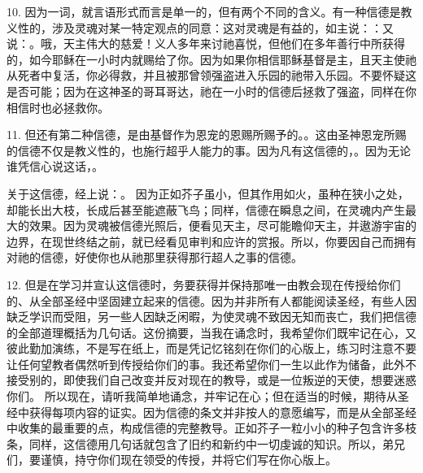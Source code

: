 10. 因为一词，就言语形式而言是单一的，但有两个不同的含义。有一种信德是教义性的，涉及灵魂对某一特定观点的同意：这对灵魂是有益的，如主说：：又说：。哦，天主伟大的慈爱！义人多年来讨祂喜悦，但他们在多年善行中所获得的，如今耶稣在一小时内就赐给了你。因为如果你相信耶稣基督是主，且天主使祂从死者中复活，你必得救，并且被那曾领强盗进入乐园的祂带入乐园。不要怀疑这是否可能；因为在这神圣的哥耳哥达，祂在一小时的信德后拯救了强盗，同样在你相信时也必拯救你。\par

11. 但还有第二种信德，是由基督作为恩宠的恩赐所赐予的。。这由圣神恩宠所赐的信德不仅是教义性的，也施行超乎人能力的事。因为凡有这信德的，。因为无论谁凭信心说这话，。\par

关于这信德，经上说：。 因为正如芥子虽小，但其作用如火，虽种在狭小之处，却能长出大枝，长成后甚至能遮蔽飞鸟；同样，信德在瞬息之间，在灵魂内产生最大的效果。因为灵魂被信德光照后，便看见天主，尽可能瞻仰天主，并遨游宇宙的边界，在现世终结之前，就已经看见审判和应许的赏报。所以，你要因自己而拥有对祂的信德，好使你也从祂那里获得那行超人之事的信德。\par

12. 但是在学习并宣认这信德时，务要获得并保持那唯一由教会现在传授给你们的、从全部圣经中坚固建立起来的信德。因为并非所有人都能阅读圣经，有些人因缺乏学识而受阻，另一些人因缺乏闲暇，为使灵魂不致因无知而丧亡，我们把信德的全部道理概括为几句话。这份摘要，当我在诵念时，我希望你们既牢记在心，又彼此勤加演练，不是写在纸上，而是凭记忆铭刻在你们的心版上，练习时注意不要让任何望教者偶然听到传授给你们的事。我还希望你们一生以此作为储备，此外不接受别的，即使我们自己改变并反对现在的教导，或是一位叛逆的天使，想要迷惑你们。 所以现在，请听我简单地诵念，并牢记在心；但在适当的时候，期待从圣经中获得每项内容的证实。因为信德的条文并非按人的意愿编写，而是从全部圣经中收集的最重要的点，构成信德的完整教导。正如芥子一粒小小的种子包含许多枝条，同样，这信德用几句话就包含了旧约和新约中一切虔诚的知识。所以，弟兄们，要谨慎，持守你们现在领受的传授，并将它们写在你心版上。\par


